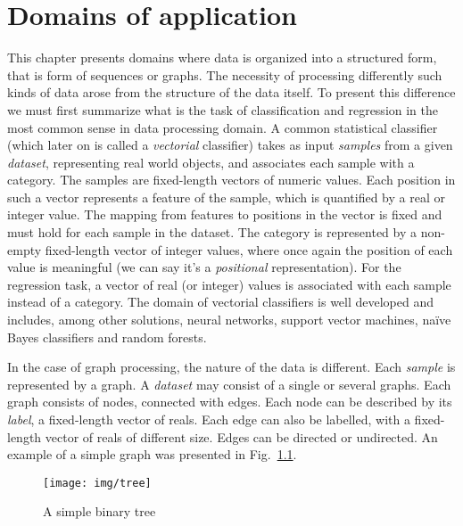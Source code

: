
\chapter{Domains of application}
This chapter presents domains where data is organized into a structured form, that is form of sequences or graphs. The necessity of processing differently such kinds of data arose from the structure of the data itself. To present this difference we must first summarize what is the task of classification and regression in the most common sense in data processing domain. A common statistical classifier (which later on is called a \emph{vectorial} classifier) takes as input \emph{samples} from a given \emph{dataset}, representing real world objects, and associates each sample with a category. The samples are fixed-length vectors of numeric values. Each position in such a vector represents a feature of the sample, which is quantified by a real or integer value. The mapping from features to positions in the vector is fixed and must hold for each sample in the dataset. The category is represented by a non-empty fixed-length vector of integer values, where once again the position of each value is meaningful (we can say it's a \emph{positional} representation). For the regression task, a vector of real (or integer) values is associated with each sample instead of a category. The domain of vectorial classifiers is well developed and includes, among other solutions, neural networks, support vector machines, naïve Bayes classifiers and random forests.

In the case of graph processing, the nature of the data is different. Each \emph{sample} is represented by a graph. A \emph{dataset} may consist of a single or several graphs. Each graph consists of nodes, connected with edges. Each node can be described by its \emph{label}, a fixed-length vector of reals. Each edge can also be labelled, with a fixed-length vector of reals of different size. Edges can be directed or undirected. An example of a simple graph was presented in Fig.~\ref{fig:simple_tree}.

\begin{figure}
\begin{center}
	\texttt{[image: img/tree]}
	\caption{A simple binary tree}
	\label{fig:simple_tree}
\end{center}
\end{figure}

